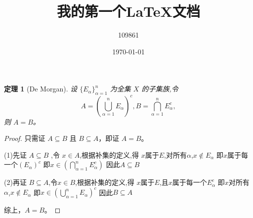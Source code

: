 \documentclass[12pt, a4paper, oneside]{ctexart}
\title{我的第一个\LaTeX 文档}
\author{109861}
\date{\today}
\newtheorem{theorem}{定理}[section]
\begin{document}
\maketitle



\begin{theorem}[De Morgan]
    设 $\{E_\alpha\}_{\alpha=1}^n$ 为全集 $X$ 的子集族,令
    \[
    A=\left( \bigcup_{\alpha =1}^{n} E_\alpha  \right)^{c},
    B=\bigcap_{\alpha =1}^{n} E_\alpha^{c} ,
    \]
    则 $A = B$。
    \end{theorem}

    \begin{proof}
    只需证 $A \subseteq B$ 且 $B \subseteq A$，即证 $A = B$。

    (1)先证 $A \subseteq B$ ,令 $x \in A$,根据补集的定义,得
    $x$属于$E$,对所有$\alpha $,$ x \notin E_\alpha $
    即$x$属于每一个$\left( E_\alpha \right)^{c} $
    即$x \in \left( \bigcap_{\alpha =1}^{n} E_\alpha^{c} \right)$
    因此$ A \subseteq B$

    (2)再证 $B \subseteq A$,令$x \in B$,根据补集的定义,得
    $x$属于$E$,且$x$属于每一个$E_\alpha^{c} $
    即$x$对所有$\alpha $,$ x \notin E_\alpha $
    即$x \in \left( \bigcup_{\alpha =1}^{n} E_\alpha \right)^{c}$
    因此$ B \subseteq A$

    综上，$A = B$。
    \end{proof}
\end{document}
